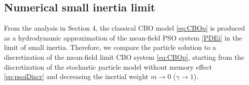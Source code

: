 \documentclass{ims9x6}
\begin{document}
\subsection{Numerical small inertia limit}
From the analysis in Section 4, the classical CBO model \eqref{eq:CBOp} is produced as a hydrodynamic approximation of the mean-field PSO system \eqref{PDEi} in the limit of small inertia.  Therefore, we compare the particle solution to a discretization of the mean-field limit CBO system \eqref{eq:CBOp}, starting from the discretization of the stochastic particle model without memory effect \eqref{eq:psoiDiscr} and decreasing the inertial weight $m \to 0$ ($\gamma \to 1$).
\end{document}
